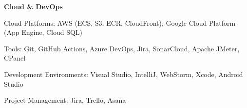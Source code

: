 \textbf{Cloud \& DevOps}
\begin{subitems}
    \item Cloud Platforms: AWS (ECS, S3, ECR, CloudFront), Google Cloud Platform (App Engine, Cloud SQL)
    \item Tools: Git, GitHub Actions, Azure DevOps, Jira, SonarCloud, Apache JMeter, CPanel
    \item Development Environments: Visual Studio, IntelliJ, WebStorm, Xcode, Android Studio
    \item Project Management: Jira, Trello, Asana
\end{subitems}


